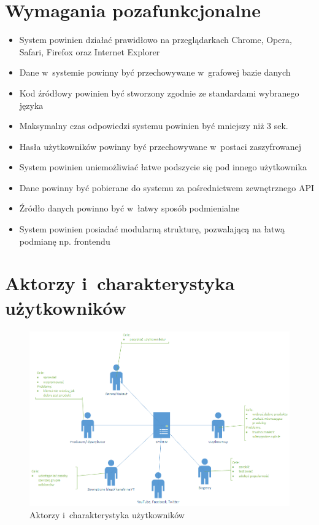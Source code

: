 \section{Wymagania pozafunkcjonalne}
\begin{itemize}
\item System powinien działać prawidłowo na przeglądarkach Chrome, Opera, Safari, Firefox oraz Internet Explorer
\item Dane w~systemie powinny być przechowywane w~grafowej bazie danych
\item Kod źródłowy powinien być stworzony zgodnie ze standardami wybranego języka
\item Maksymalny czas odpowiedzi systemu powinien być mniejszy niż 3 sek.
\item Hasła użytkowników powinny być przechowywane w~postaci zaszyfrowanej
\item System powinien uniemożliwiać łatwe podszycie się pod innego użytkownika 
\item Dane powinny być pobierane do systemu za pośrednictwem zewnętrznego API
\item Źródło danych powinno być w~łatwy sposób podmienialne
\item System powinien posiadać modularną strukturę, pozwalającą na łatwą podmianę np. frontendu
\end{itemize}

\section{Aktorzy i~charakterystyka użytkowników}
\begin{figure}[H]
	\centering
	\includegraphics[width=\textwidth, keepaspectratio=true]{images/Strony_cele.png}
	\caption{Aktorzy i~charakterystyka użytkowników}
\end{figure}
